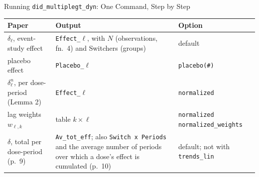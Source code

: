 \documentclass[main.tex]{subfiles}
\begin{document}
\begin{frame}[fragile]{Running \texttt{did\_multiplegt\_dyn}: One Command, Step by Step}
  \smallskip
  \begin{center}\tiny
  \setlength{\tabcolsep}{3pt}
  \begin{tabular}{@{}p{2.8cm}p{5.0cm}p{2.9cm}@{}}
    \toprule
    Paper & Output & Option \\
    \midrule
    $\delta_\ell$, event-study effect & \texttt{Effect\_}$\ell$, with $N$ (observations, fn.~4) and Switchers (groups) & default \\
    placebo effect & \texttt{Placebo\_}$\ell$ & \texttt{placebo(\#)} \\
    $\delta^{n}_\ell$, per dose-period (Lemma 2) & \texttt{Effect\_}$\ell$ & \texttt{normalized} \\
    lag weights $w_{\ell,k}$ & table $k \times \ell$ & \texttt{normalized normalized\_weights} \\
    $\delta$, total per dose-period (p.~9) & \texttt{Av\_tot\_eff}; also \texttt{Switch x Periods} and the average number of periods over which a dose's effect is cumulated (p.~10) & default; not with \texttt{trends\_lin} \\
    \bottomrule
  \end{tabular}
  \end{center}

\end{frame}
\end{document}
